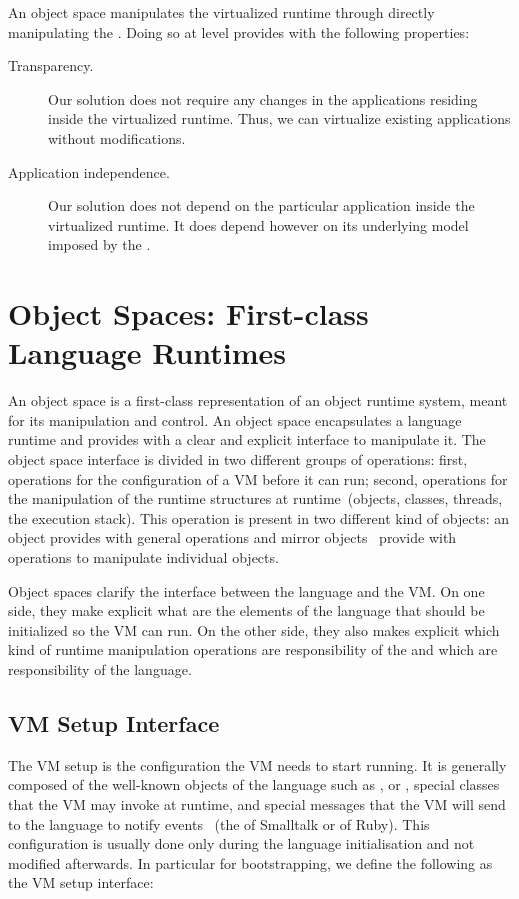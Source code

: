 An object space manipulates the virtualized runtime through directly manipulating the \VM. Doing so at \VM level provides \Vtt with the following properties:

\begin{description}
\item[Transparency.] Our solution does not require any changes in the applications residing inside the virtualized runtime. Thus, we can virtualize existing applications without modifications.
\item[Application independence.] Our solution does not depend on the particular application inside the virtualized runtime. It does depend however on its underlying model imposed by the \VM.
\end{description}

\section{Object Spaces: First-class Language Runtimes} \label{sec:object_space}

An object space is a first-class representation of an object runtime system, meant for its manipulation and control. An object space encapsulates a language runtime and provides with a clear and explicit interface to manipulate it. The object space interface is divided in two different groups of operations: first, operations for the configuration of a VM before it can run; second, operations for the manipulation of the runtime structures at runtime~(objects, classes, threads, the execution stack). This operation is present in two different kind of objects: an  object provides with general operations and mirror objects~\cite{Brac04b} provide with operations to manipulate individual objects.

Object spaces clarify the interface between the language and the VM. On one side, they make explicit what are the elements of the language that should be initialized so the VM can run. On the other side, they also makes explicit which kind of runtime manipulation operations are responsibility of the \VM and which are responsibility of the language.

\subsection{VM Setup Interface}

The VM setup is the configuration the VM needs to start running. It is generally composed of the well-known objects of the language such as ,  or , special classes that the VM may invoke at runtime, and special messages that the VM will send to the language to notify events ~(\eg the  of Smalltalk or  of Ruby). This configuration is usually done only during the language initialisation and not modified afterwards. In particular for bootstrapping, we define the following as the VM setup interface:

